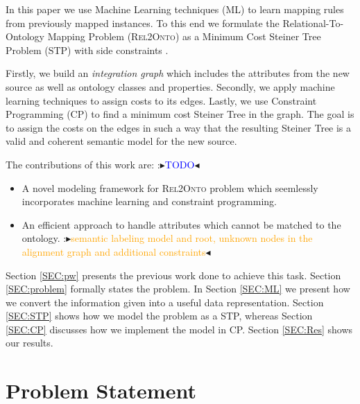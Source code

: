 \documentclass[letterpaper]{article} %
\newcommand{\authornote}[3]{
  {\fbox{\sc 
  #1}:$\blacktriangleright$\textcolor{#2}{\small{#3}}$\blacktriangleleft$}%
}
\newcommand{\ddg}[1]{\authornote{DDG}{blue}{#1}}
\newcommand{\npr}[1]{\authornote{NPR}{orange}{#1}}
\newcommand{\relonto}{\textsc{Rel2Onto}}
\begin{document}
In this paper we use Machine Learning techniques (ML) to learn mapping rules from previously mapped instances.
To this end we formulate the Relational-To-Ontology Mapping Problem (\relonto{}) as a Minimum Cost Steiner Tree Problem (STP) with side constraints \cite{deuna2016steiner}.

Firstly, we build an \emph{integration graph} which includes the 
attributes from the new source as well as ontology classes and properties. 
Secondly, we apply machine learning techniques to 
assign costs to its edges. 
Lastly, we use Constraint Programming (CP) to 
find a minimum cost Steiner Tree in the graph.
The goal is to assign the costs on the edges in such a way that the resulting Steiner Tree is a valid and coherent semantic model for the new source. 

The contributions of this work are:\ddg{TODO}
\begin{itemize}
	\item A novel modeling framework for \relonto{} problem which seemlessly incorporates machine learning and constraint programming.
	\item An efficient approach to handle attributes which cannot be matched to the ontology. \npr{semantic labeling model and root, unknown nodes in the alignment graph and additional constraints} 
\end{itemize}

Section \ref{SEC:pw} presents the previous work done to achieve this task. 
Section \ref{SEC:problem} formally states the problem. 
In Section \ref{SEC:ML} we present how we convert the information given into a 
useful data representation. 
Section \ref{SEC:STP} shows how we model the problem as a STP, 
whereas Section \ref{SEC:CP} discusses how we implement the model in CP. 
Section \ref{SEC:Res} shows our results. 

\section{Problem Statement \label{SEC:problem}}
\end{document}

